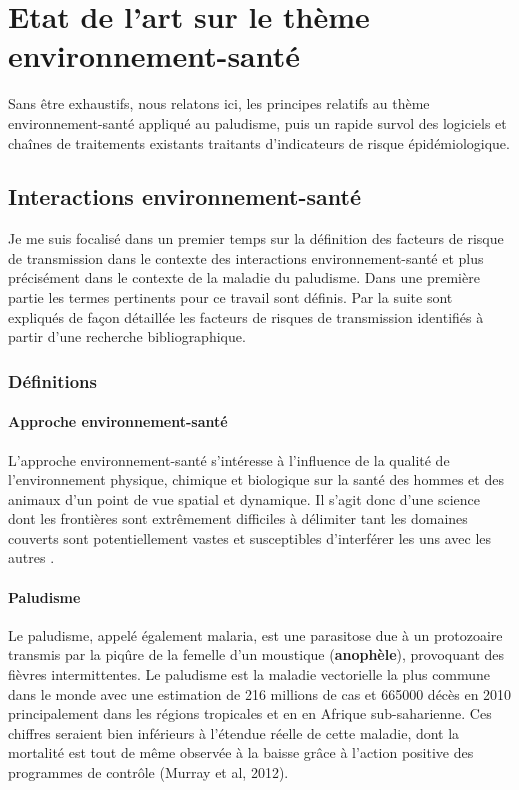 \chapter{Etat de l'art sur le thème environnement-santé} \label{Art}

Sans être exhaustifs, nous relatons ici, les principes relatifs au thème environnement-santé appliqué au paludisme, puis un rapide survol des logiciels et chaînes de traitements existants traitants d'indicateurs de risque épidémiologique.

\section{Interactions environnement-santé}

Je me suis focalisé dans un premier temps sur la définition des facteurs de risque de transmission dans le contexte des interactions environnement-santé et plus précisément dans le contexte de la maladie du paludisme. Dans une première partie les termes pertinents pour ce travail sont définis. Par la suite sont expliqués de façon détaillée les facteurs de risques de transmission identifiés à partir d'une recherche bibliographique.

\subsection{Définitions}


\subsubsection{Approche environnement-santé}

L'approche environnement-santé s'intéresse à l'influence de la qualité de l'environnement physique, chimique et biologique sur la santé des hommes et des animaux d'un point de vue spatial et dynamique. Il s'agit donc d'une science dont les frontières sont extrêmement difficiles à délimiter tant les domaines couverts sont  potentiellement vastes et susceptibles d'interférer les uns avec les autres \citep{afsset2006}.

\subsubsection{Paludisme}
Le paludisme, appelé également malaria, est une parasitose due à un protozoaire transmis par la piqûre de la femelle d'un moustique (\textbf{anophèle}), provoquant des fièvres intermittentes. Le paludisme est la maladie vectorielle la plus commune dans le monde avec une estimation de 216 millions de cas et 665000 décès en 2010 \citep{WHO2012} principalement dans les régions tropicales et en en Afrique sub-saharienne. Ces chiffres seraient bien inférieurs à l'étendue réelle de cette maladie, dont la mortalité est tout de même observée à la baisse grâce à l'action positive des programmes de contrôle (Murray et al, 2012).

